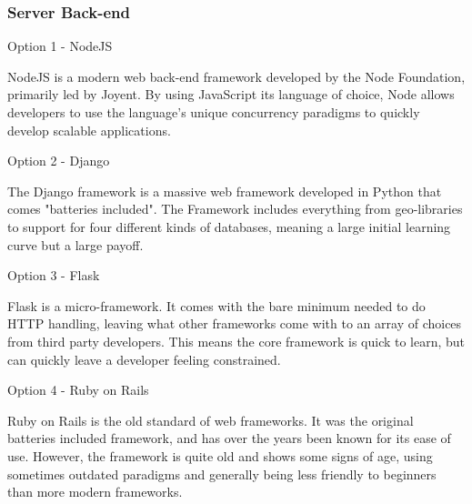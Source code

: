 \documentclass[letterpaper, 10pt, draftclsnofoot, compsoc, onecolumn]{IEEEtran}
\begin{document}
{\subsubsection{Server Back-end}
{\noindent Option 1 - NodeJS \par}
{\noindent NodeJS is a modern web back-end framework developed by the Node Foundation,
primarily led by Joyent. By using JavaScript its language of choice, Node allows
developers to use the language's unique concurrency paradigms to quickly develop
scalable applications. \par}
{\noindent Option 2 - Django \par}
{\noindent The Django framework is a massive web framework developed in Python that comes "batteries
included". The Framework includes everything from geo-libraries to support for four different kinds of
databases, meaning a large initial learning curve but a large payoff. \par}
{\noindent Option 3 - Flask \par}
{\noindent Flask is a micro-framework. It comes with the bare minimum needed to do HTTP handling, leaving
what other frameworks come with to an array of choices from third party developers. This means the core
framework is quick to learn, but can quickly leave a developer feeling constrained. \par}
{\noindent Option 4 - Ruby on Rails \par}
{\noindent Ruby on Rails is the old standard of web frameworks. It was the original batteries included
framework, and has over the years been known for its ease of use. However, the framework is quite old
and shows some signs of age, using sometimes outdated paradigms and generally being less friendly to beginners
than more modern frameworks. \par}

}
\end{document}
